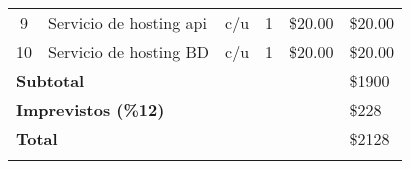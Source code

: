 \begin{ThreePartTable}
\begin{longtable}{c p{} c c p{} p{}}
		9                                               & Servicio de hosting api   & c/u             & 1                 & \$20.00                 & \$20.00              \\
		10                                              & Servicio de hosting BD    & c/u             & 1                 & \$20.00                 & \$20.00              \\
		\midrule
		\multicolumn{5}{l}{\textbf{Subtotal}}           & \$1900                                                                                                           \\
		\multicolumn{5}{l}{\textbf{Imprevistos (\%12)}} & \$228                                                                                                            \\
		\multicolumn{5}{l}{\textbf{Total}}              & \$2128                                                                                                          \\
		\bottomrule
		\insertTableNotes
	\end{longtable}
\end{ThreePartTable}
